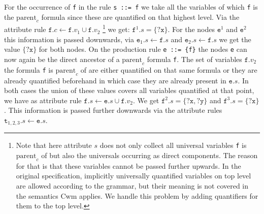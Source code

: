 For the occurrence of \texttt{f} in the rule \texttt{s ::= f} we take all the variables of which \texttt{f} is the $\text{parent}_c$ formula since these are
quantified on that highest level.
Via the attribute rule $\texttt{f}.c\leftarrow \texttt{f}.v_1 \cup \texttt{f}.v_2$%
\footnote{Note that here attribute $s$ does not only collect all universal variables 
\texttt{f} is $\text{parent}_c$ of but also 
the universals occurring as direct components. The reason for that is that these variables cannot be passed further upwards. In the original \nthree specification, 
implicitly universally quantified variables on top level are allowed according to the grammar,
but their meaning is not covered in the semantics Cwm applies. We handle this problem by adding quantifiers for them to the top level.
} 
we get:
$ \texttt{f}^1.s=\{\texttt{?x}\}
$.
For the nodes $\texttt{e}^1$ and $\texttt{e}^2$ this information is passed downwards, 
via $\texttt{e}_1.s\leftarrow \texttt{f}.s$ and $\texttt{e}_2.s\leftarrow \texttt{f}.s$ we get the value $\{\texttt{?x}\}$ for both nodes.
On the production rule \texttt{e ::= \{f\}}
the nodes \texttt{e} can now again be the direct ancestor of a $\text{parent}_c$ formula \texttt{f}. The set of variables $\texttt{f}.v_2$ the formula \texttt{f} is $\text{parent}_c$ of are 
either quantified on that same formula
or they are already quantified beforehand in which case they are already present in $\texttt{e}.s$.
In both cases the union of these values covers all variables quantified at that point, we have as attribute
rule $\texttt{f}.s\leftarrow \texttt{e}.s\cup \texttt{f}.v_2$.
%
We get
$\texttt{f}^2.s =\{\texttt{?x}, \texttt{?y}\}$ and
$\texttt{f}^3.s =  \{\texttt{?x}\}$.
This information is passed further downwards via the attribute rules $\texttt{t}_{1,2,3}.s\leftarrow \texttt{e}.s$.
